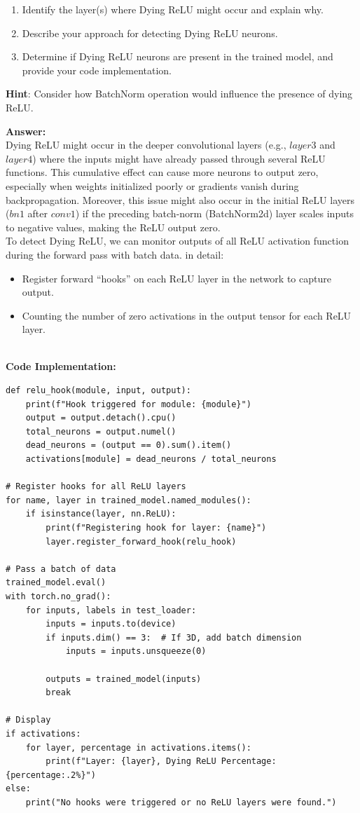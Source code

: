 \documentclass[11pt, oneside]{article}   	%
\begin{document}
\begin{enumerate}
    \item Identify the layer(s) where Dying ReLU might occur and explain why.
    \item Describe your approach for detecting Dying ReLU neurons. 
    \item Determine if Dying ReLU neurons are present in the trained model, and provide your code implementation.
\end{enumerate}
\textbf{Hint}:
Consider how BatchNorm operation would influence the presence of dying ReLU.
    
\textbf{Answer:} \\
Dying ReLU might occur in the deeper convolutional layers (e.g., $layer3$ and $layer4$) where the inputs might have already passed through several ReLU functions. This cumulative effect can cause more neurons to output zero, especially when weights initialized poorly or gradients vanish during backpropagation. Moreover, this issue might also occur in the initial ReLU layers ($bn1$ after $conv1$) if the preceding batch-norm (BatchNorm2d) layer scales inputs to negative values, making the ReLU output zero.
\\
To detect Dying ReLU, we can monitor outputs of all ReLU activation function during the forward pass with batch data. in detail:
\begin{itemize}
    \item Register forward ``hooks'' on each ReLU layer in the network to capture output.
    \item Counting the number of zero activations in the output tensor for each ReLU layer.
\end{itemize}
\\
\textbf{Code Implementation: }
\begin{verbatim}
def relu_hook(module, input, output):
    print(f"Hook triggered for module: {module}")
    output = output.detach().cpu()
    total_neurons = output.numel()
    dead_neurons = (output == 0).sum().item()
    activations[module] = dead_neurons / total_neurons

# Register hooks for all ReLU layers
for name, layer in trained_model.named_modules():
    if isinstance(layer, nn.ReLU):
        print(f"Registering hook for layer: {name}")
        layer.register_forward_hook(relu_hook)

# Pass a batch of data
trained_model.eval()
with torch.no_grad():
    for inputs, labels in test_loader:
        inputs = inputs.to(device)
        if inputs.dim() == 3:  # If 3D, add batch dimension
            inputs = inputs.unsqueeze(0)

        outputs = trained_model(inputs)
        break

# Display
if activations:
    for layer, percentage in activations.items():
        print(f"Layer: {layer}, Dying ReLU Percentage: {percentage:.2%}")
else:
    print("No hooks were triggered or no ReLU layers were found.")
\end{verbatim}
\end{document}

